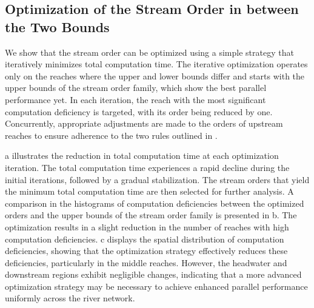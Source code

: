 \documentclass[water,article,submit,pdftex,moreauthors]{Definitions/mdpi}
\begin{document}
\subsection{Optimization of the Stream Order in between the Two Bounds}
\label{sec:optimization_yangtze}

We show that the stream order can be optimized using a simple strategy that iteratively minimizes total computation time. The iterative optimization operates only on the reaches where the upper and lower bounds differ and starts with the upper bounds of the stream order family, which show the best parallel performance yet. In each iteration, the reach with the most significant computation deficiency is targeted, with its order being reduced by one. Concurrently, appropriate adjustments are made to the orders of upstream reaches to ensure adherence to the two rules outlined in .

a illustrates the reduction in total computation time at each optimization iteration. The total computation time experiences a rapid decline during the initial iterations, followed by a gradual stabilization. The stream orders that yield the minimum total computation time are then selected for further analysis. A comparison in the histograms of computation deficiencies between the optimized orders and the upper bounds of the stream order family is presented in b. The optimization results in a slight reduction in the number of reaches with high computation deficiencies. c displays the spatial distribution of computation deficiencies, showing that the optimization strategy effectively reduces these deficiencies, particularly in the middle reaches. However, the headwater and downstream regions exhibit negligible changes, indicating that a more advanced optimization strategy may be necessary to achieve enhanced parallel performance uniformly across the river network.
\end{document}
